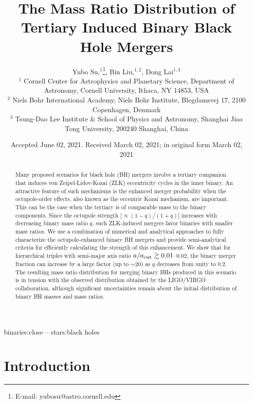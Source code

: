 \documentclass[
        fleqn,
        usenatbib,
    ]{mnras}
\title[Mass Ratio Distribution]{The Mass Ratio Distribution of
Tertiary Induced Binary Black Hole Mergers}
\author[Y. Su et\ al.]{
Yubo Su,$^1$\thanks{E-mail: yubosu@astro.cornell.edu},
Bin Liu,$^{1,2}$,
Dong Lai$^{1,3}$
\\
$^1$ Cornell Center for Astrophysics and Planetary Science, Department of
Astronomy, Cornell University, Ithaca, NY 14853, USA\\
$^2$ Niels Bohr International Academy, Niels Bohr Institute, Blegdamsvej 17,
2100 Copenhagen, Denmark\\
$^3$ Tsung-Dao Lee Institute \& School of Physics and Astronomy, Shanghai Jiao
Tong University, 200240 Shanghai, China
}
\date{Accepted June 02, 2021\@. Received March 02, 2021\@; in original form
March 02, 2021}
\begin{document}
\label{firstpage}
\pagerange{\pageref{firstpage}--\pageref{lastpage}}
\maketitle

\begin{abstract}
    Many proposed scenarios for black hole (BH) mergers involve a tertiary
    companion that induces von Zeipel-Lidov-Kozai (ZLK) eccentricity cycles in
    the inner binary. An attractive feature of such mechanisms is the enhanced
    merger probability when the octupole-order effects, also known as the
    eccentric Kozai mechanism, are important. This can be the case when the
    tertiary is of comparable mass to the binary components. Since the octupole
    strength [$\propto (1-q)/(1+q)$] increases with decreasing binary mass ratio
    $q$, such ZLK-induced mergers favor binaries with smaller mass ratios. We
    use a combination of numerical and analytical approaches to fully
    characterize the octupole-enhanced binary BH mergers and provide
    semi-analytical criteria for efficiently calculating the
    strength of this enhancement. We show that for hierarchical triples with
    semi-major axis ratio $a/a_{\rm out}\gtrsim 0.01$--$0.02$, the binary merger
    fraction can increase by a large factor (up to $\sim 20$) as $q$ decreases
    from unity to $0.2$. The resulting mass ratio distribution for merging
    binary BHs produced in this scenario is in tension with the observed
    distribution obtained by the LIGO/VIRGO collaboration, although significant
    uncertainties remain about the initial distribution of binary BH masses and
    mass ratios.
\end{abstract}

\begin{keywords}
binaries:close -- stars:black holes %
\end{keywords}

\section{Introduction}\label{s:intro}
\end{document}
